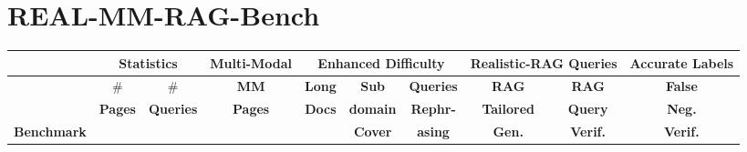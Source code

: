 


\section{REAL-MM-RAG-Bench}
\label{sec:benchmark}



\begin{table*}[t]
\footnotesize
\renewcommand{\arraystretch}{1.5} %
\vspace{-0.15cm}
\centering
\begin{tabular*}{0.89\linewidth}{lccccccccc} 
\toprule
{} 
& \multicolumn{2}{c}{\textbf{Statistics}} 
& \multicolumn{1}{c}{\textbf{Multi-Modal}} 
& \multicolumn{3}{c}{\textbf{Enhanced Difficulty}} 
& \multicolumn{2}{c}{\textbf{Realistic-RAG Queries}} 
& {\textbf{Accurate Labels}} 
\\
\midrule

{} 
& {\textbf{$\#$ }} 
& {\textbf{$\#$ }} 
& {\textbf{MM}} 
& {\textbf{Long}} 
& {\textbf{Sub}} 
& {\textbf{Queries}} 
& {\textbf{RAG}} 
& {\textbf{RAG}} 
& {\textbf{False }} 
\\

{} 
& {\textbf{Pages}} 
& {\textbf{Queries}} 
& {\textbf{Pages}} 
& {\textbf{Docs}}
& {\textbf{domain}} 
& {\textbf{Rephr-}} 
& {\textbf{Tailored}} 
& {\textbf{Query}} 
& {\textbf{Neg.}} 
\\

{\textbf{Benchmark}} 
& {} 
& {} 
& {\textbf{}} 
& {\textbf{}} 
& {\textbf{Cover}} 
& {\textbf{asing}} 
& {\textbf{Gen.}} 
& {\textbf{Verif.}} 
& {\textbf{Verif.}} 
\\


\end{tabular*}
\end{table*}
